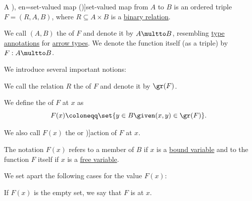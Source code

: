 \begin{definition}\label{def:set_valued_function}\mimprovised
  A \term[ru=многозначное отображение (\cite[253]{ПоловинкинБалашов2007ВыпуклыйАнализ}), en=set-valued map (\cite[def. 1.3.1]{AubinFrankowska1990SetValuedAnalysis})]{set-valued map} from \( A \) to \( B \) is an ordered triple \( F = (R, A, B) \), where \( R \subseteq A \times B \) is a \hyperref[def:binary_relation]{binary relation}.

  We call \( (A, B) \) the  of \( F \) and denote it by \( A \multto B \), resembling \hyperref[con:type_annotation]{type annotations} for \hyperref[def:arrow_type]{arrow types}. We denote the function itself (as a triple) by \( F: A \multto B \).

  We introduce several important notions:
  \begin{thmenum}[series=def:set_valued_function]
     We call the relation \( R \) the  of \( F \) and denote it by \( \gr(F) \).

     We define the  of \( F \) at \( x \) as
    \begin{equation*}
      F(x) \coloneqq \set{ y \in B \given (x, y) \in \gr(F) }.
    \end{equation*}

    We also call \( F(x) \) the  or \term[en=action (\cite[9]{Aluffi2009Algebra})]{action} of \( F \) at \( x \).

    The notation \( F(x) \) refers to a member of \( B \) if \( x \) is a \hyperref[con:variable_binding]{bound variable} and to the function \( F \) itself if \( x \) is a \hyperref[con:variable_binding]{free variable}.

     We set apart the following cases for the value \( F(x) \):
    \begin{thmenum}
       If \( F(x) \) is the empty set, we say that \( F \) is  at \( x \).


\end{thmenum}
\end{thmenum}
\end{definition}
